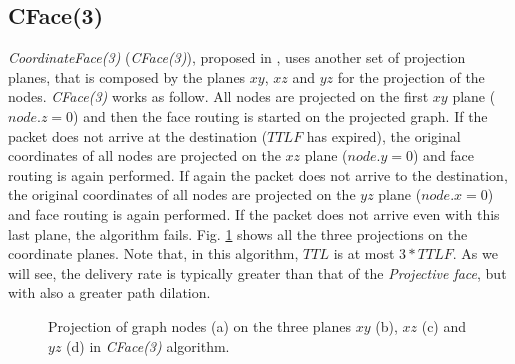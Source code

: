 \documentclass[journal,comsoc]{IEEEtran}
\begin{document}
\subsection{CFace(3)}
\emph{CoordinateFace(3)} (\emph{CFace(3)}), proposed in \cite{abdallah:random}, uses another set of projection planes, that is composed by the planes \(xy\), \(xz\) and \(yz\) for the projection of the nodes. \emph{CFace(3)} works as follow. All nodes are projected on the first \(xy\) plane (\(node.z = 0\)) and then the face routing is started on the projected graph. If the packet does not arrive at the destination (\(TTLF\) has expired), the original coordinates of all nodes are projected on the \(xz\) plane (\(node.y = 0\)) and face routing is again performed. If again the packet does not arrive to the destination, the original coordinates of all nodes are projected on the \(yz\) plane (\(node.x = 0\)) and face routing is again performed. If the packet does not arrive even with this last plane, the algorithm fails. Fig. \ref{fig:cface} shows all the three projections on the coordinate planes. Note that, in this algorithm, \(TTL\) is at most \(3*TTLF\). As we will see, the delivery rate is typically greater than that of the \emph{Projective face}, but with also a greater path dilation.

\begin{figure}[!t]
\centering
{}%
%
\qquad
{}%
%
\caption{Projection of graph nodes (a) on the three planes \(xy\) (b), \(xz\) (c) and \(yz\) (d) in \emph{CFace(3)} algorithm.}
\label{fig:cface}
\end{figure}
\end{document}
